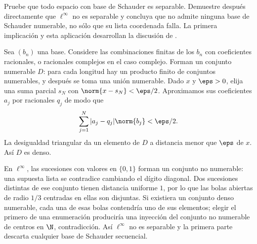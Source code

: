 \begin{ejercicio}\label{ej:ampl-schauder-3}
Pruebe que todo espacio con base de Schauder es separable. Demuestre después directamente que $\ell^\infty$ no es separable y concluya que no admite ninguna base de Schauder numerable, no sólo que su lista coordenada falla. La primera implicación y esta aplicación desarrollan la discusión de \cite{max-schauder}.
\end{ejercicio}
\begin{solucion}
Sea $(b_n)$ una base. Considere las combinaciones finitas de los $b_n$ con coeficientes racionales, o racionales complejos en el caso complejo. Forman un conjunto numerable $D$: para cada longitud hay un producto finito de conjuntos numerables, y después se toma una unión numerable. Dado $x$ y $\eps>0$, elija una suma parcial $s_N$ con $\norm{x-s_N}<\eps/2$. Aproximamos sus coeficientes $a_j$ por racionales $q_j$ de modo que
\[
 \sum_{j=1}^N|a_j-q_j|\norm{b_j}<\eps/2.
\]
La desigualdad triangular da un elemento de $D$ a distancia menor que $\eps$ de $x$. Así $D$ es denso.

En $\ell^\infty$, las sucesiones con valores en $\{0,1\}$ forman un conjunto no numerable: una supuesta lista se contradice cambiando el dígito diagonal. Dos sucesiones distintas de ese conjunto tienen distancia uniforme $1$, por lo que las bolas abiertas de radio $1/3$ centradas en ellas son disjuntas. Si existiera un conjunto denso numerable, cada una de esas bolas contendría uno de sus elementos; elegir el primero de una enumeración produciría una inyección del conjunto no numerable de centros en $\N$, contradicción. Así $\ell^\infty$ no es separable y la primera parte descarta cualquier base de Schauder secuencial.
\end{solucion}

